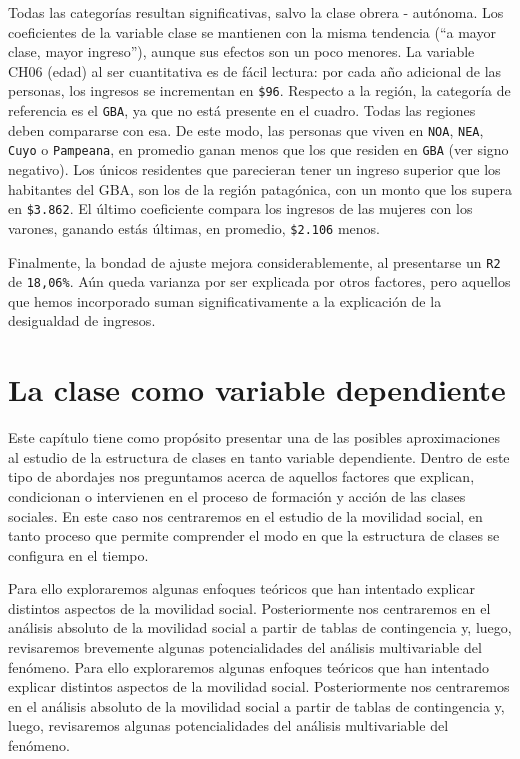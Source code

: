 \documentclass[
]{article}
\begin{document}
Todas las categorías resultan significativas, salvo la clase obrera - autónoma. Los coeficientes de la variable clase se mantienen con la misma tendencia (``a mayor clase, mayor ingreso''), aunque sus efectos son un poco menores. La variable CH06 (edad) al ser cuantitativa es de fácil lectura: por cada año adicional de las personas, los ingresos se incrementan en \texttt{\$96}. Respecto a la región, la categoría de referencia es el \texttt{GBA}, ya que no está presente en el cuadro. Todas las regiones deben compararse con esa. De este modo, las personas que viven en \texttt{NOA}, \texttt{NEA}, \texttt{Cuyo} o \texttt{Pampeana}, en promedio ganan menos que los que residen en \texttt{GBA} (ver signo negativo). Los únicos residentes que parecieran tener un ingreso superior que los habitantes del GBA, son los de la región patagónica, con un monto que los supera en \texttt{\$3.862}. El último coeficiente compara los ingresos de las mujeres con los varones, ganando estás últimas, en promedio, \texttt{\$2.106} menos.

Finalmente, la bondad de ajuste mejora considerablemente, al presentarse un \texttt{R2} de \texttt{18,06\%}. Aún queda varianza por ser explicada por otros factores, pero aquellos que hemos incorporado suman significativamente a la explicación de la desigualdad de ingresos.

\hypertarget{dependiente}{%
\section{La clase como variable dependiente}\label{dependiente}}

Este capítulo tiene como propósito presentar una de las posibles aproximaciones al estudio de la estructura de clases en tanto variable dependiente. Dentro de este tipo de abordajes nos preguntamos acerca de aquellos factores que explican, condicionan o intervienen en el proceso de formación y acción de las clases sociales. En este caso nos centraremos en el estudio de la movilidad social, en tanto proceso que permite comprender el modo en que la estructura de clases se configura en el tiempo.

Para ello exploraremos algunas enfoques teóricos que han intentado explicar distintos aspectos de la movilidad social. Posteriormente nos centraremos en el análisis absoluto de la movilidad social a partir de tablas de contingencia y, luego, revisaremos brevemente algunas potencialidades del análisis multivariable del fenómeno. Para ello exploraremos algunas enfoques teóricos que han intentado explicar distintos aspectos de la movilidad social. Posteriormente nos centraremos en el análisis absoluto de la movilidad social a partir de tablas de contingencia y, luego, revisaremos algunas potencialidades del análisis multivariable del fenómeno.
\end{document}
